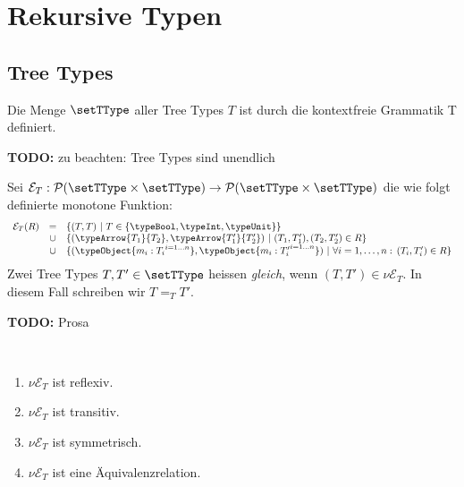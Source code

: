 
\chapter{Rekursive Typen}
\label{kapitel:Rekursive_Typen}



\section{Tree Types}

\begin{definition} \label{definition:Tree_Types:Tree_Types}
  Die Menge $\setTType$ aller Tree Types $T$ ist durch die kontextfreie Grammatik
  \GRbeg
    T \GRis \typeBool \GRmid \typeInt \GRmid \typeUnit
      \GRal {}
      \GRal {}
  \GRend
  definiert.
\end{definition}

{\bf TODO:} zu beachten: Tree Types sind unendlich

\begin{definition} \label{definition:Tree_Types:Gleichheit}
  Sei $\mathcal{E}_T: \mathcal{P}(\setTType\times\setTType) \to \mathcal{P}(\setTType\times\setTType)$
  die wie folgt definierte monotone Funktion:
  \[\begin{array}{rcl}
    \mathcal{E}_T(R)
    & =    & \{(T,T)\ |\ T \in \{\typeBool,\typeInt,\typeUnit\}\} \\
    & \cup & \{(\typeArrow{T_1}{T_2},\typeArrow{T_1'}{T_2'})\ |\ (T_1,T_1'),(T_2,T_2')\in R\} \\
    & \cup & \{(\typeObject{{m_i:T_i}^{i=1 \ldots n}},\typeObject{{m_i:T_i'}^{i=1 \ldots n}})\ |\ 
               \forall i=1,\ldots,n:\,(T_i,T_i') \in R\}
  \end{array}\]
  Zwei Tree Types $T,T' \in \setTType$ heissen {\em gleich}, wenn $(T,T')\in \nu \mathcal{E}_T$.
  In diesem Fall schreiben wir $T =_T T'$.
\end{definition}

{\bf TODO:} Prosa

\begin{lemma} \label{lemma:Tree_Types:Aequivalenzrelation} \
  \begin{enumerate}
    \item $\nu \mathcal{E}_T$ ist reflexiv.
    \item $\nu \mathcal{E}_T$ ist transitiv.
    \item $\nu \mathcal{E}_T$ ist symmetrisch.
    \item $\nu \mathcal{E}_T$ ist eine \"Aquivalenzrelation.
  \end{enumerate}
\end{lemma}

